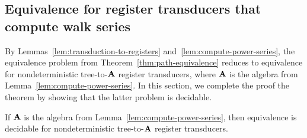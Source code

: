 \subsection{Equivalence for register transducers that compute walk series}\label{sec:decide-power-series}
By Lemmas~\ref{lem:transduction-to-registers} and~\ref{lem:compute-power-series}, the  equivalence problem from Theorem~\ref{thm:path-equivalence} reduces to equivalence for nondeterministic tree-to-$\mathbf{A}$ register transducers, where $\mathbf{A}$ is the algebra from Lemma~\ref{lem:compute-power-series}. In this section, we complete the proof the theorem by showing that the latter problem is decidable.
\begin{lemma}\label{lem:functionality-decidable-power-series} If $\mathbf{A}$ is the algebra from Lemma~\ref{lem:compute-power-series}, then equivalence is decidable for nondeterministic tree-to-$\mathbf{A}$ register transducers. 
\end{lemma}
